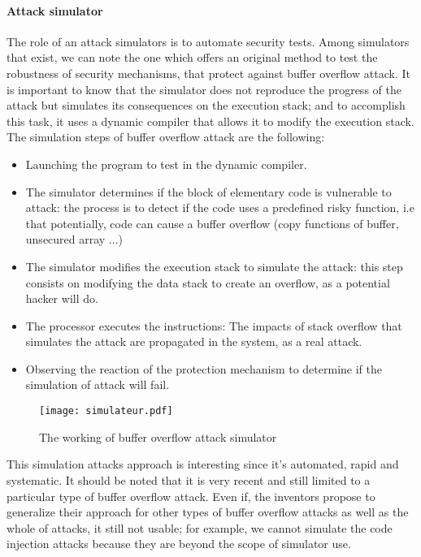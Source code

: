 \documentclass{acm_proc_article-sp}
\begin{document}
\paragraph{Attack simulator}
The role of an attack simulators \cite{Breech:2006:ASS:1190616.1191230} is to automate security tests. Among simulators that exist, we can note the one which offers an original method to test the robustness of security mechanisms, that protect against buffer overflow attack. It is important to know that the simulator does not reproduce the progress of the attack but simulates its consequences on the execution stack; and to accomplish this task, it uses a dynamic compiler that allows it to modify the execution stack. The simulation steps of buffer overflow attack are the following:
\begin{itemize}
 \item Launching the program to test in the dynamic compiler.
 \item The simulator determines if the block of elementary code is vulnerable to attack: the process is to detect if the code uses a predefined risky function, i.e that potentially, code can cause a buffer overflow (copy functions of buffer, unsecured array ...)
 \item The simulator modifies the execution stack to simulate the attack: this step consists on modifying the data stack to create an overflow, as a potential hacker will do.
 \item The processor executes the instructions: The impacts of stack overflow that simulates the attack are propagated in the system, as a real attack.
 \item Observing the reaction of the protection mechanism to determine if the simulation of attack will fail.\\
\end{itemize}
\begin{figure}[h!]                                                       \centering                                                               \texttt{[image: simulateur.pdf]}        \caption{The working of buffer overflow attack simulator}                \label{The working of buffer overflow attack simulator}                  \end{figure}                                                             

This simulation attacks approach is interesting since it's automated, rapid and systematic. It should be noted that it is very recent and still limited to a particular type of buffer overflow attack. Even if, the inventors propose to generalize their approach for other types of buffer overflow attacks as well as the whole of attacks, it still not usable; for example, we cannot simulate the code injection attacks because they are beyond the scope of simulator use.
\end{document}
